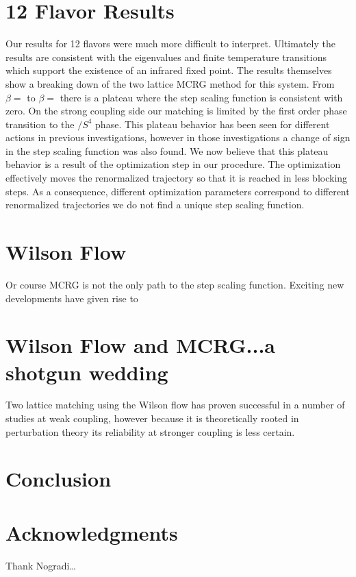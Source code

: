 \documentclass{PoS}
\begin{document}
\section{12 Flavor Results}
Our results for 12 flavors were much more difficult to interpret.
Ultimately the results are consistent with the eigenvalues and finite temperature transitions which support the existence of an infrared fixed point.
The results themselves show a breaking down of the two lattice MCRG method for this system.  From $\beta = $ to $\beta = $ there is a plateau where the step scaling function is consistent with zero.  
On the strong coupling side our matching is limited by the first order phase transition to the $\slash{S^4}$ phase.
This plateau behavior has been seen for different actions in previous investigations, however in those investigations a change of sign in the step scaling function was also found.
We now believe that this plateau behavior is a result of the optimization step in our procedure.
The optimization effectively moves the renormalized trajectory so that it is reached in less blocking steps.
As a consequence, different optimization parameters correspond to different renormalized trajectories we do not find a unique step scaling function.



\section{Wilson Flow}
Or course MCRG is not the only path to the step scaling function.  Exciting new developments have given rise to 

\section{Wilson Flow and MCRG...a shotgun wedding}
Two lattice matching using the Wilson flow has proven successful in a number of studies at weak coupling, however because it is theoretically rooted in perturbation theory its reliability at stronger coupling is less certain.


\section{Conclusion}

\section{Acknowledgments}
Thank Nogradi\dots
\end{document}
